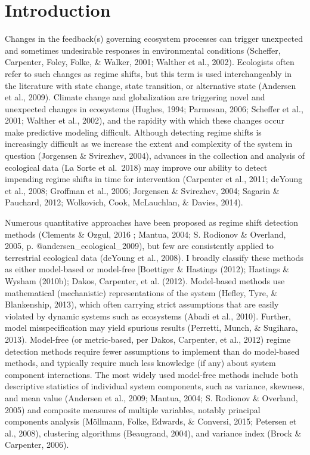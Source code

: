 \documentclass[12pt,twoside,openany]{reedthesis}
\begin{document}
\hypertarget{introduction-1}{%
\section{Introduction}\label{introduction-1}}

Changes in the feedback(s) governing ecosystem processes can trigger unexpected and sometimes undesirable responses in environmental conditions (Scheffer, Carpenter, Foley, Folke, \& Walker, 2001; Walther et al., 2002). Ecologists often refer to such changes as regime shifts, but this term is used interchangeably in the literature with state change, state transition, or alternative state (Andersen et al., 2009). Climate change and globalization are triggering novel and unexpected changes in ecosystems (Hughes, 1994; Parmesan, 2006; Scheffer et al., 2001; Walther et al., 2002), and the rapidity with which these changes occur make predictive modeling difficult. Although detecting regime shifts is increasingly difficult as we increase the extent and complexity of the system in question (Jorgensen \& Svirezhev, 2004), advances in the collection and analysis of ecological data (La Sorte et al.~2018) may improve our ability to detect impending regime shifts in time for intervention (Carpenter et al., 2011; deYoung et al., 2008; Groffman et al., 2006; Jorgensen \& Svirezhev, 2004; Sagarin \& Pauchard, 2012; Wolkovich, Cook, McLauchlan, \& Davies, 2014).

Numerous quantitative approaches have been proposed as regime shift detection methods (Clements \& Ozgul, 2016 ; Mantua, 2004; S. Rodionov \& Overland, 2005, p. @andersen\_ecological\_2009), but few are consistently applied to terrestrial ecological data (deYoung et al., 2008). I broadly classify these methods as either model-based or model-free {[}Boettiger \& Hastings (2012); Hastings \& Wysham (2010b); Dakos, Carpenter, et al. (2012). Model-based methods use mathematical (mechanistic) representations of the system (Hefley, Tyre, \& Blankenship, 2013), which often carrying strict assumptions that are easily violated by dynamic systems such as ecosystems (Abadi et al., 2010). Further, model misspecification may yield spurious results (Perretti, Munch, \& Sugihara, 2013). Model-free (or metric-based, per Dakos, Carpenter, et al., 2012) regime detection methods require fewer assumptions to implement than do model-based methods, and typically require much less knowledge (if any) about system component interactions. The most widely used model-free methods include both descriptive statistics of individual system components, such as variance, skewness, and mean value (Andersen et al., 2009; Mantua, 2004; S. Rodionov \& Overland, 2005) and composite measures of multiple variables, notably principal components analysis (Möllmann, Folke, Edwards, \& Conversi, 2015; Petersen et al., 2008), clustering algorithms (Beaugrand, 2004), and variance index (Brock \& Carpenter, 2006).
\end{document}
